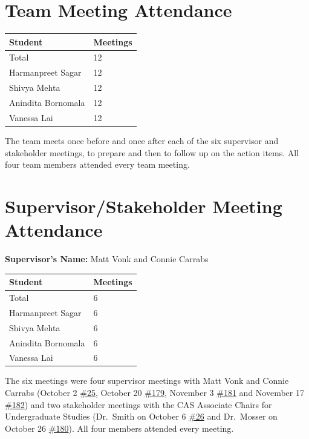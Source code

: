 \documentclass{article}
\begin{document}
\section{Team Meeting Attendance}

\begin{table}[H]
\centering
\begin{tabular}{ll}
\toprule
\textbf{Student} & \textbf{Meetings}\\
\midrule
Total & 12\\
Harmanpreet Sagar & 12\\
Shivya Mehta & 12\\
Anindita Bornomala & 12\\
Vanessa Lai & 12\\
\bottomrule
\end{tabular}
\end{table}

The team meets once before and once after each of the six supervisor and stakeholder meetings, to prepare and then to follow up on the action items. All four team members attended every team meeting.

\section{Supervisor/Stakeholder Meeting Attendance}

\noindent \textbf{Supervisor's Name: } Matt Vonk and Connie Carrabs

\begin{table}[H]
\centering
\begin{tabular}{ll}
\toprule
\textbf{Student} & \textbf{Meetings}\\
\midrule
Total & 6\\
Harmanpreet Sagar & 6\\
Shivya Mehta & 6\\
Anindita Bornomala & 6\\
Vanessa Lai & 6\\
\bottomrule
\end{tabular}
\end{table}

The six meetings were four supervisor meetings with Matt Vonk and Connie Carrabs
(October 2 \href{https://github.com/shivyam/cas-course-optimization/issues/25}{\#25}, October 20 \href{https://github.com/shivyam/cas-course-optimization/issues/179}{\#179}, November 3 \href{https://github.com/shivyam/cas-course-optimization/issues/181}{\#181} and
November 17 \href{https://github.com/shivyam/cas-course-optimization/issues/182}{\#182}) and two stakeholder meetings with the CAS Associate
Chairs for Undergraduate Studies (Dr.~Smith on October 6 \href{https://github.com/shivyam/cas-course-optimization/issues/26}{\#26} and
Dr.~Mosser on October 26 \href{https://github.com/shivyam/cas-course-optimization/issues/180}{\#180}). All four members attended every meeting.
\end{document}

